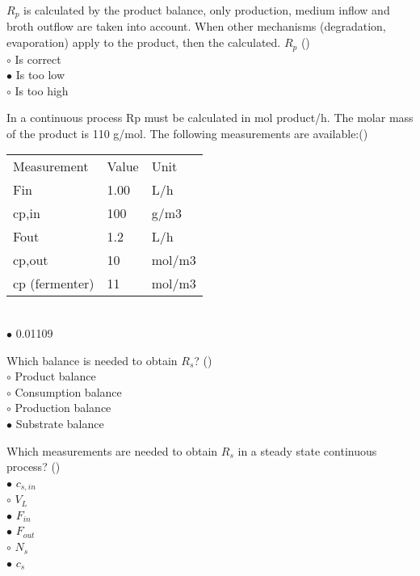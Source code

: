 \documentclass[]{beamer}
\begin{document}
\begin{frame}[shrink] {}
\addtocounter{questions}{1}
\color{blue}
$R_p$ is calculated by the product balance, only production, medium inflow and broth outflow are taken into account.
When other mechanisms (degradation, evaporation) apply to the product, then the calculated. $R_p$ ()\\
\color{black}
\setlength{\parindent}{-0.4cm}
{\color{red}$\circ$} Is correct\\
{\color{red}$\bullet$} Is too low \\
{\color{red}$\circ$} Is too high \\
\end{frame}

\begin{frame}[shrink] {}
\addtocounter{questions}{1}
\color{blue}
In a continuous process Rp must be calculated in mol product/h. The molar mass of the product is 110 g/mol. The following measurements are available:({})\\[0.3em]
\color{gray}
\begin{tabular}[]{l l l}
Measurement & Value & Unit\\
Fin & 1.00 & L/h\\
cp,in& 	100& 	g/m3\\
Fout& 	1.2& 	L/h\\
cp,out&  	10 & 	mol/m3\\
cp (fermenter) & 11 & 	mol/m3\\
\end{tabular}\\[0.3em]
\color{black}
\setlength{\parindent}{-0.4cm}
{\color{red}$\bullet$} 0.01109
 
\end{frame}

\begin{frame}[shrink] {}
\addtocounter{questions}{1}
\color{blue}
Which balance is needed to obtain $R_s$? ()\\[0.3em]
\color{black}
\setlength{\parindent}{-0.4cm}
{\color{red}$\circ$}  Product balance  \\
{\color{red}$\circ$} Consumption balance\\
{\color{red}$\circ$} Production balance \\
{\color{red}$\bullet$} Substrate balance 
\end{frame}

\begin{frame}[shrink] {}
\addtocounter{questions}{1}
\color{blue}
Which measurements are needed to obtain $R_s$ in a steady state continuous process?  ()\\
\color{black}
\setlength{\parindent}{-0.4cm}
{\color{red}$\bullet$}  $c_{s,in}$\\
{\color{red}$\circ$} $V_L$\\
{\color{red}$\bullet$} $F_{in}$\\
{\color{red}$\bullet$} $F_{out}$\\
{\color{red}$\circ$} $N_s$\\
{\color{red}$\bullet$} $c_s$
\end{frame}
\end{document}
